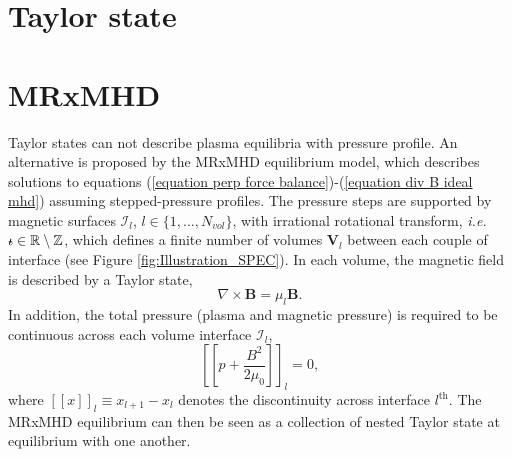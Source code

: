 \documentclass[my_thesis.tex]{subfiles}
\begin{document}
\section{Taylor state}
\label{section taylor state}


\section{MRxMHD}
\label{section mrxmhd}

Taylor states can not describe plasma equilibria with pressure profile. An alternative is proposed by the MRxMHD equilibrium model, which describes solutions to equations (\ref{equation perp force balance})-(\ref{equation div B ideal mhd}) assuming stepped-pressure profiles. The pressure steps are supported by magnetic surfaces $\mathcal{I}_l$, $l\in\{1,\ldots,N_{vol}\}$, with irrational rotational transform, \textit{i.e.} $\text{$\iota\!\!$-}\in\mathbb{R}\setminus\mathbb{Z}$, which defines a finite number of volumes $\mathbf{V}_l$ between each couple of interface (see Figure \ref{fig:Illustration_SPEC}). In each volume, the magnetic field is described by a Taylor state, 
\begin{equation}
	\nabla\times\mathbf{B}=\mu_l\mathbf{B}. \label{eq.BeltramiEquation}
\end{equation}
In addition, the total pressure (plasma and magnetic pressure) is required to be continuous across each volume interface $\mathcal{I}_l$,
\begin{equation}
	\left[\left[p + \frac{B^2}{2\mu_0}\right]\right]_l = 0, \label{eq.force_balance}
\end{equation}
where $[[x]]_l\equiv x_{l+1}-x_l$ denotes the discontinuity across interface $l^{\text{th}}$. The MRxMHD equilibrium can then be seen as a collection of nested Taylor state at equilibrium with one another. 
\end{document}

